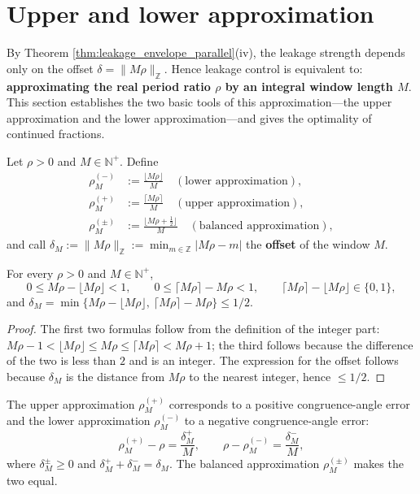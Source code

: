 \section{Upper and lower approximation}\label{sec:bounded_approximation}

By Theorem \ref{thm:leakage_envelope_parallel}(iv), the leakage strength depends only on the offset $\delta=\|M\rho\|_{\mathbb{Z}}$. Hence leakage control is equivalent to: \textbf{approximating the real period ratio $\rho$ by an integral window length $M$}. This section establishes the two basic tools of this approximation---the upper approximation and the lower approximation---and gives the optimality of continued fractions.

\begin{definition}\label{def:bounded_approximation_parallel}
Let $\rho>0$ and $M\in\mathbb{N}^+$. Define
\[
\begin{aligned}
\rho^{(-)}_M&:=\frac{\lfloor M\rho\rfloor}{M}\quad(\text{lower approximation}),\\
\rho^{(+)}_M&:=\frac{\lceil M\rho\rceil}{M}\quad(\text{upper approximation}),\\
\rho^{(\pm)}_M&:=\frac{\lfloor M\rho+\tfrac12\rfloor}{M}\quad(\text{balanced approximation}),
\end{aligned}
\]
and call $\delta_M:=\|M\rho\|_{\mathbb{Z}}:=\min_{m\in\mathbb{Z}}|M\rho-m|$ the \textbf{offset} of the window $M$.
\end{definition}

\begin{proposition}\label{prop:bounds_integrality}
For every $\rho>0$ and $M\in\mathbb{N}^+$,
\[
0\le M\rho-\lfloor M\rho\rfloor<1,\qquad 0\le\lceil M\rho\rceil-M\rho<1,\qquad
\lceil M\rho\rceil-\lfloor M\rho\rfloor\in\{0,1\},
\]
and $\delta_M=\min\{M\rho-\lfloor M\rho\rfloor,\ \lceil M\rho\rceil-M\rho\}\le1/2$.
\end{proposition}

\begin{proof}
The first two formulas follow from the definition of the integer part: $M\rho-1<\lfloor M\rho\rfloor\le M\rho\le\lceil M\rho\rceil<M\rho+1$; the third follows because the difference of the two is less than $2$ and is an integer. The expression for the offset follows because $\delta_M$ is the distance from $M\rho$ to the nearest integer, hence $\le1/2$.
\end{proof}

\begin{proposition}\label{prop:bounded_approx_congruence}
The upper approximation $\rho^{(+)}_M$ corresponds to a positive congruence-angle error and the lower approximation $\rho^{(-)}_M$ to a negative congruence-angle error:
\[
\rho^{(+)}_M-\rho=\frac{\delta_M^+}{M},\qquad
\rho-\rho^{(-)}_M=\frac{\delta_M^-}{M},
\]
where $\delta_M^\pm\ge0$ and $\delta_M^++\delta_M^-=\delta_M$. The balanced approximation $\rho^{(\pm)}_M$ makes the two equal.
\end{proposition}

